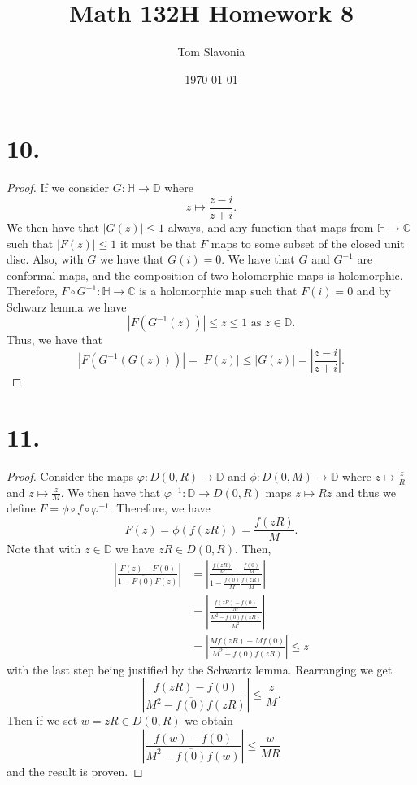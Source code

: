 \documentclass{article}
\title{Math 132H Homework 8}
\author{Tom Slavonia}
\date{\today}
\begin{document}
\maketitle

\section*{10.}
\begin{proof}
   If we consider $G:\mathbb{H} \to \mathbb{D}$ where 
   \[
   z \mapsto \frac{z - i}{z + i}. 
   \] 
   We then have that $|G(z)| \leq 1$ always, and any function that maps from $\mathbb{H} \to \mathbb{C}$ such that $|F(z)|\leq 1$ it must be that $F$ maps to some subset of the closed unit disc. Also, with $G$ we have that $G(i) = 0$. We have that $G$ and $G^{-1}$ are conformal maps, and the composition of two holomorphic maps is holomorphic. Therefore, $F\circ G^{-1}: \mathbb{H} \to \mathbb{C}$ is a holomorphic map such that $F(i) = 0$ and by Schwarz lemma we have 
   \[
   |F(G^{-1}(z))| \leq z \leq 1 \text{ as } z \in \mathbb{D}.  
   \]
   Thus, we have that 
   \[
   |F(G^{-1}(G(z)))| = |F(z)| \leq |G(z)| = \left|\frac{z - i}{z + i}\right|.
   \]


\end{proof}

\section*{11.}
\begin{proof}
   Consider the maps $\varphi:D(0, R) \to \mathbb{D}$ and $\phi:D(0, M) \to \mathbb{D}$ where $z\mapsto \frac{z}{R}$ and $z \mapsto \frac{z}{M}$. We then have that $\varphi^{-1}:\mathbb{D} \to D(0, R)$ maps $z \mapsto Rz$ and thus we define $F = \phi \circ f \circ \varphi^{-1}$. Therefore, we have
   \[
   F(z) = \phi(f(zR)) = \frac{f(zR)}{M}. 
   \]
   Note that with $z \in \mathbb{D}$ we have $zR \in D(0, R)$. 
   Then, 
   \begin{align*}
   \left|\frac{F(z) - F(0)}{1 - \overline{F(0)}F(z)}\right| &= \left|\frac{\frac{f(zR)}{M} - \frac{f(0)}{M}}{1 - \frac{\overline{f(0)}}{M}\frac{f(zR)}{M}}\right| \\
   &= \left|\frac{\frac{f(zR) - f(0)}{M}}{\frac{M^2- \overline{f(0)}f(zR)}{M^2}}\right| \\
   &= \left|\frac{Mf(zR) - Mf(0)}{M^2 - \overline{f(0)}f(zR)}\right| \leq z
   \end{align*}
   with the last step being justified by the Schwartz lemma. Rearranging we get 
   \[
    \left|\frac{f(zR) - f(0)}{M^2 - \overline{f(0)}f(zR)}\right| \leq \frac{z}{M}.
   \]
   Then if we set $w = zR \in D(0, R)$ we obtain
   \[
   \left|\frac{f(w) - f(0)}{M^2 - \overline{f(0)}f(w)} \right| \leq \frac{w}{MR} 
   \]
   and the result is proven. 
\end{proof}
\end{document}
